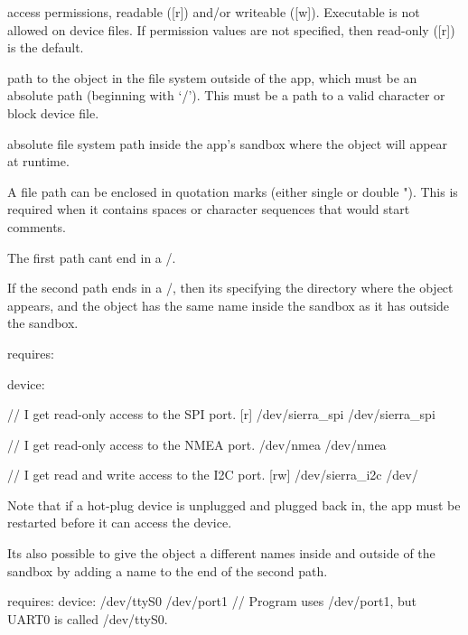 \begin{DoxyItemize}
\item access permissions, readable (\mbox{[}r\mbox{]}) and/or writeable (\mbox{[}w\mbox{]}). Executable is not allowed on device files. If permission values are not specified, then read-\/only (\mbox{[}r\mbox{]}) is the default.
\item path to the object in the file system outside of the app, which must be an absolute path (beginning with ‘/’). This must be a path to a valid character or block device file.
\item absolute file system path inside the app’s sandbox where the object will appear at runtime.
\end{DoxyItemize}

A file path can be enclosed in quotation marks (either single \textquotesingle{} or double "). This is required when it contains spaces or character sequences that would start comments.

The first path can\textquotesingle{}t end in a \textquotesingle{}/\textquotesingle{}.

If the second path ends in a \textquotesingle{}/\textquotesingle{}, then it\textquotesingle{}s specifying the directory where the object appears, and the object has the same name inside the sandbox as it has outside the sandbox.

\begin{DoxyVerb}requires:
{
    device:
    {
        // I get read-only access to the SPI port.
        [r]     /dev/sierra_spi   /dev/sierra_spi

        // I get read-only access to the NMEA port.
                /dev/nmea         /dev/nmea

        // I get read and write access to the I2C port.
        [rw]    /dev/sierra_i2c   /dev/
    }
}
\end{DoxyVerb}


Note that if a hot-\/plug device is unplugged and plugged back in, the app must be restarted before it can access the device.

It\textquotesingle{}s also possible to give the object a different names inside and outside of the sandbox by adding a name to the end of the second path.

\begin{DoxyVerb}requires:
{
    device:
    {
        /dev/ttyS0  /dev/port1     // Program uses /dev/port1, but UART0 is called /dev/ttyS0.
    }
}
\end{DoxyVerb}


